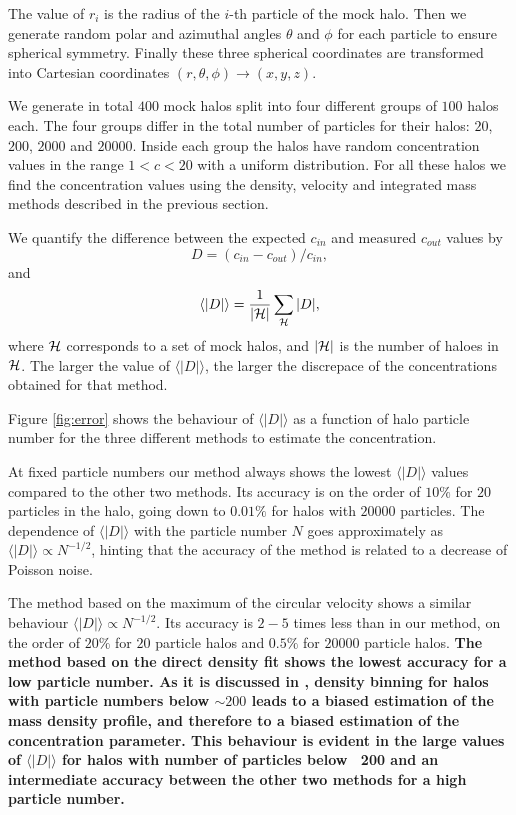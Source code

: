 \documentclass[a4,useAMS,usenatbib,usegraphicx]{mn2e}
\newcommand{\avg}[1]{\langle{#1}\rangle}
\begin{document}
The value of $r_i$ is the radius of the $i$-th particle of the mock
halo.  
Then we generate random polar and azimuthal angles $\theta$ and
$\phi$ for each particle to ensure spherical symmetry.  
Finally these three spherical coordinates are transformed into
Cartesian coordinates $(r,\theta,\phi) \rightarrow (x,y,z)$.

We generate in total $400$ mock halos split into four different groups
of $100$ halos each.  The four groups differ in the total number of
particles for their halos: $20$, $200$, $2000$ and $20000$.  
Inside each group the halos have random concentration values in the range
$1<c<20$ with a uniform distribution.  
For all these halos we find  the concentration values using the
density, velocity and integrated mass methods described in the
previous section.   


We quantify the difference between the expected $c_{in}$ and measured
$c_{out}$ values by 
%
\begin{equation}
D=(c_{in}-c_{out})/c_{in},
\label{eq:D}
\end{equation}
%
and
%
\begin{equation}
\avg{|D|}=\frac{1}{\left|{\cal{H}}\right|}\sum_{{\cal{H}}} |D|,
\end{equation}
%
where ${\cal{H}}$ corresponds to a set of mock halos, and
$\left|{\cal{H}}\right|$ is the number of haloes in ${\cal{H}}$. 
  The larger the value of $\avg{|D|}$, the larger the discrepace of
  the concentrations obtained for that method.




Figure \ref{fig:error} shows the behaviour of $\avg{|D|}$ as a function of
halo particle number for the three different methods to estimate the
concentration.

At fixed particle numbers our method always shows the lowest
$\avg{|D|}$ values compared to the other two methods.  Its accuracy is
on the order of $10\%$ for $20$ particles in the halo, going down to
$0.01\%$ for halos with $20000$ particles.  The dependence of
$\avg{|D|}$ with the particle number $N$ goes approximately as
$\avg{|D|}\propto N^{-1/2}$, hinting that the accuracy of the method
is related to a decrease of Poisson noise.

The method based on the maximum of the circular velocity shows a
similar behaviour $\avg{|D|}\propto N^{-1/2}$.  Its accuracy is $2-5$
times less than in our method, on the order of $20\%$ for $20$
particle halos and $0.5\%$ for $20000$ particle halos. {\bf The method
  based on the direct density fit shows the lowest accuracy for a low
  particle number. As it is discussed in \citep{Munoz2011}, density
  binning for halos with particle numbers below $\sim200$ leads to a
  biased estimation of the mass density profile, and therefore to a
  biased estimation of the concentration parameter. This behaviour is
  evident in the large values of $\avg{|D|}$ for halos with number of
  particles below ~200 and an intermediate accuracy between the other
  two methods for a high particle number.}
\end{document}

